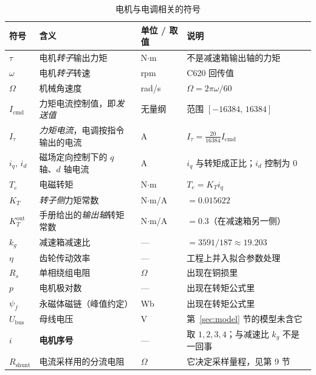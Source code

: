 \documentclass[cn,blue,11pt,device=normal]{elegantnote}
\newcommand{\Icmd}{I_{\mathrm{cmd}}{}}
\newcommand{\Itau}{I_{\tau}{}}
\newcommand{\KT}{K_{T}{}}
\begin{document}
\begin{table}[htbp]
  \centering
  \small
  \caption{电机与电调相关的符号}
  \label{tab:sym-motor}
  \begin{tabular}{@{}>{\raggedright\arraybackslash}p{}>{\raggedright\arraybackslash}p{}>{\raggedright\arraybackslash}p{}>{\raggedright\arraybackslash}p{}@{}}
    \toprule
    符号 & 含义 & 单位 / 取值 & 说明 \\
    \midrule
    $\tau$        & 电机\emph{转子}输出力矩 & N$\cdot$m & 不是减速箱输出轴的力矩 \\
    $\omega$      & 电机\emph{转子}转速 & rpm & C620 回传值 \\
    $\Omega$      & 机械角速度 & rad/s & $\Omega=2\pi\omega/60$ \\
    $\Icmd$       & 力矩电流控制值，即\emph{发送值} & 无量纲 & 范围 $[-16384,\,16384]$ \\
    $\Itau$       & \emph{力矩电流}，电调按指令输出的电流 & A & $\Itau=\frac{20}{16384}\Icmd$ \\
    $i_q,\,i_d$   & 磁场定向控制下的 $q$ 轴、$d$ 轴电流 & A & $i_q$ 与转矩成正比；$i_d$ 控制为 $0$ \\
    $T_e$         & 电磁转矩 & N$\cdot$m & $T_e=\KT i_q$ \\
    $\KT$         & \emph{转子侧}力矩常数 & N$\cdot$m/A & $=0.015622$ \\
    $K_T^{\mathrm{out}}$ & 手册给出的\emph{输出轴}转矩常数 & N$\cdot$m/A & $=0.3$（在减速箱另一侧） \\
    $k_g$         & 减速箱减速比 & — & $=3591/187\approx19.203$ \\
    $\eta$        & 齿轮传动效率 & — & 工程上并入拟合参数处理 \\
    $R_s$         & 单相绕组电阻 & $\Omega$ & 出现在铜损里 \\
    $p$           & 电机极对数 & — & 出现在转矩公式里 \\
    $\psi_f$      & 永磁体磁链（峰值约定） & Wb & 出现在转矩公式里 \\
    $U_{\mathrm{bus}}$ & 母线电压 & V & 第~\ref{sec:model} 节的模型未含它 \\
    $i$           & \textbf{电机序号} & — & 取 $1,2,3,4$；与减速比 $k_g$ 不是一回事 \\
    $R_{\mathrm{shunt}}$ & 电流采样用的分流电阻 & $\Omega$ & 它决定采样量程，见第 9 节 \\
    \bottomrule
  \end{tabular}
\end{table}
\end{document}
